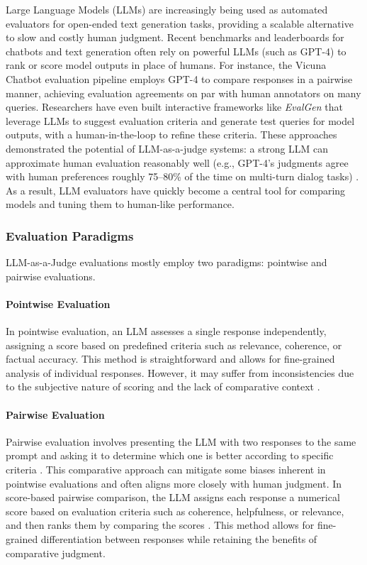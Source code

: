 \documentclass[sigconf, authoryear]{acmart}
\begin{document}
Large Language Models (LLMs) are increasingly being used as automated evaluators for open-ended text generation tasks, providing a scalable alternative to slow and costly human judgment.
Recent benchmarks and leaderboards for chatbots and text generation often rely on powerful LLMs (such as GPT-4) to rank or score model outputs in place of humans.
For instance, the Vicuna Chatbot evaluation pipeline employs GPT-4 to compare responses in a pairwise manner, achieving evaluation agreements on par with human annotators on many queries.
Researchers have even built interactive frameworks like \textit{EvalGen} \cite{evalgen} that leverage LLMs to suggest evaluation criteria and generate test queries for model outputs, with a human-in-the-loop to refine these criteria.
These approaches demonstrated the potential of LLM-as-a-judge systems: a strong LLM can approximate human evaluation reasonably well (e.g., GPT-4’s judgments agree with human preferences roughly 75–80\% of the time on multi-turn dialog tasks) \cite{mtbench}.
As a result, LLM evaluators have quickly become a central tool for comparing models and tuning them to human-like performance.

\subsubsection{Evaluation Paradigms}

LLM-as-a-Judge evaluations mostly employ two paradigms: pointwise and pairwise evaluations.

\paragraph{Pointwise Evaluation}
In pointwise evaluation, an LLM assesses a single response independently, assigning a score based on predefined criteria such as relevance, coherence, or factual accuracy.
This method is straightforward and allows for fine-grained analysis of individual responses.
However, it may suffer from inconsistencies due to the subjective nature of scoring and the lack of comparative context \cite{evalgen}.

\paragraph{Pairwise Evaluation}
Pairwise evaluation involves presenting the LLM with two responses to the same prompt and asking it to determine which one is better according to specific criteria \cite{liusie2024llmcomparativeassessmentzeroshot}.
This comparative approach can mitigate some biases inherent in pointwise evaluations and often aligns more closely with human judgment.
In score-based pairwise comparison, the LLM assigns each response a numerical score based on evaluation criteria such as coherence, helpfulness, or relevance, and then ranks them by comparing the scores \cite{liu2024aligning}.
This method allows for fine-grained differentiation between responses while retaining the benefits of comparative judgment.
\end{document}
